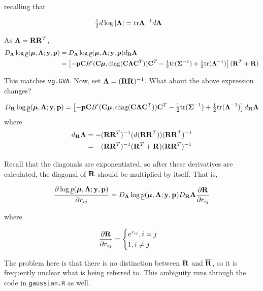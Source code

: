 \documentclass{article}[12pt]
\newcommand{\mgc}[1]{{\color{blue}#1}}
\begin{document}
\noindent recalling that

\begin{align*}
	\tfrac{1}{2} d \log |{\boldsymbol \Lambda}| &= \text{tr} {\boldsymbol\Lambda}^{-1} d {\boldsymbol \Lambda}
\end{align*}

\noindent As ${\boldsymbol \Lambda} = {\bf R} {\bf R}^T$,
\begin{align*}
	D_{\boldsymbol \Lambda} \log \underline{p}({\boldsymbol \mu}, {\boldsymbol \Lambda}; {\bf y}, {\bf p}) &= D_{\boldsymbol \Lambda} \log \underline{p}({\boldsymbol \mu}, {\boldsymbol \Lambda}; {\bf y}, {\bf p}) d_{\bf R} {\boldsymbol \Lambda} \\
	&= \left [-{\bf p} {\bf C} B'({\bf C} {\boldsymbol \mu}, \text{diag}{({\bf C}{\boldsymbol\Lambda}{\bf C}^T)}) {\bf C}^T - \tfrac{1}{2} \text{tr}{({\boldsymbol\Sigma}^{-1})} + \tfrac{1}{2} \text{tr}{({\boldsymbol\Lambda}^{-1})}\right ] ({\bf R}^T + {\bf R})
\end{align*}

\noindent This matches \texttt{vg.GVA}. Now, set ${\boldsymbol \Lambda} = ({\bf R} {\bf R})^{-1}$. What about the
above expression changes?

\[
	D_{\bf R} \log \underline{p}({\boldsymbol \mu}, {\boldsymbol \Lambda}; {\bf y}, {\bf p}) = \left [ -{\bf p} {\bf C} B'({\bf C} {\boldsymbol \mu}, \text{diag}{({\bf C}{\boldsymbol\Lambda}{\bf C}^T)}) {\bf C}^T - \tfrac{1}{2} \text{tr}{({\boldsymbol\Sigma}^{-1})} + \tfrac{1}{2} \text{tr}{({\boldsymbol\Lambda}^{-1})} \right ] d_{\bf R} {\boldsymbol \Lambda}
\]
where
\begin{align*}
	d_{\bf R} {\boldsymbol \Lambda} &= -({\bf R} {\bf R}^T)^{-1} (d({\bf R} {\bf R}^T)) ({\bf R} {\bf R}^T)^{-1} \\
	&=-({\bf R} {\bf R}^T)^{-1} ({\bf R}^T + {\bf R}) ({\bf R} {\bf R}^T)^{-1} \\
\end{align*}

\noindent Recall that the diagonals are exponentiated, so after these derivatives are
calculated, the diagonal of ${\bf R}$ should be multiplied by itself. That is,

\[
	\frac{\partial \log \underline{p}({\boldsymbol \mu}, {\boldsymbol \Lambda}; {\bf y}, {\bf p})}{\partial r_{ij}} = D_{\boldsymbol \Lambda} \log \underline{p}({\boldsymbol \mu}, {\boldsymbol \Lambda}; {\bf y}, {\bf p}) D_{\bf R} {\boldsymbol \Lambda} \frac{\partial {\bf R}}{\partial r_{ij}}
\]

where

\[
	\frac{\partial {\bf R}}{\partial r_{ij}} =
	\begin{cases}
		e^{r_{ij}}, i = j \\
		1, i \ne j
	\end{cases}
\]

\mgc{The problem here is that there is no distinction between ${\bf R}$ and $\overline{{\bf R}}$, so it is frequently
unclear what is being referred to. This ambiguity runs through the code in \texttt{gaussian.R} as well.}
\end{document}
